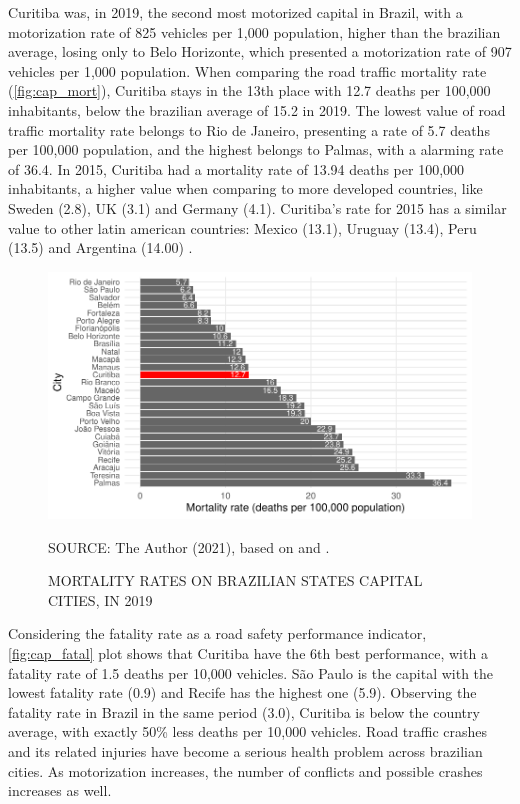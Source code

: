 Curitiba was, in 2019, the second most motorized capital in Brazil, with a motorization rate of 825 vehicles per 1,000 population, higher than the brazilian average, losing only to Belo Horizonte, which presented a motorization rate of 907 vehicles per 1,000 population. When comparing the road traffic mortality rate (\autoref{fig:cap_mort}), Curitiba stays in the 13th place with 12.7 deaths per 100,000 inhabitants, below the brazilian average of 15.2 in 2019. The lowest value of road traffic mortality rate belongs to Rio de Janeiro, presenting a rate of 5.7 deaths per 100,000 population, and the highest belongs to Palmas, with a alarming rate of 36.4. In 2015, Curitiba had a mortality rate of 13.94 deaths per 100,000 inhabitants, a higher value when comparing to more developed countries, like Sweden (2.8), UK (3.1) and Germany (4.1). Curitiba's rate for 2015 has a similar value to other latin american countries: Mexico (13.1), Uruguay (13.4), Peru (13.5) and Argentina (14.00) \cite{WHO2018}. 

\begin{figure}[!htbp]
    \centering\footnotesize
    \captionsetup{font=footnotesize}
    \caption{MORTALITY RATES ON BRAZILIAN STATES CAPITAL CITIES, IN 2019}
    \includegraphics{fig/cap_mort.pdf}
    \label{fig:cap_mort}
    \par SOURCE: The Author (2021), based on \textcite{MinistryofHealth2020} and \textcite{MinistryofHealth2021}.
\end{figure}  

Considering the fatality rate as a road safety performance indicator, \autoref{fig:cap_fatal} plot shows that Curitiba have the 6th best performance, with a fatality rate of 1.5 deaths per 10,000 vehicles. São Paulo is the capital with the lowest fatality rate (0.9) and Recife has the highest one (5.9). Observing the fatality rate in Brazil in the same period (3.0), Curitiba is below the country average, with exactly 50\% less deaths per 10,000 vehicles. Road traffic crashes and its related injuries have become a serious health problem across brazilian cities. As motorization increases, the number of conflicts and possible crashes increases as well.

